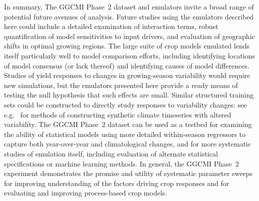 \documentclass[gmdd]{copernicus} %
\begin{document}
In summary, The GGCMI Phase~2 dataset and emulators invite a broad range of potential future avenues of analysis.
Future studies using the emulators described here could include a detailed examination of interaction terms, robust quantification of model sensitivities to input drivers, and evaluation of geographic shifts in optimal growing regions. 
The large suite of crop models emulated lends itself particularly well to model comparison efforts, including identifying locations of model consensus (or lack thereof) and identifying causes of model differences.
Studies of yield responses to changes in growing-season variability would require new simulations, but the emulators presented here provide a ready means of testing the null hypothesis that such effects are small.
Similar structured training sets could be constructed to directly study responses to variability changes: see e.g.\ \citet{poppick2016, Haugen2018} for methods of constructing synthetic climate timeseries with altered variability. 
The GGCMI Phase~2 dataset can be used as a testbed for examining the ability of statistical models using more detailed within-season regressors to capture both year-over-year and climatological changes, and for more systematic studies of emulation itself, including evaluation of alternate statistical specifications or machine learning methods.
In general, the GGCMI Phase~2 experiment demonstrates the promise and utility of systematic parameter sweeps for improving understanding of the factors driving crop responses and for evaluating and improving process-based crop models.


\end{document}
